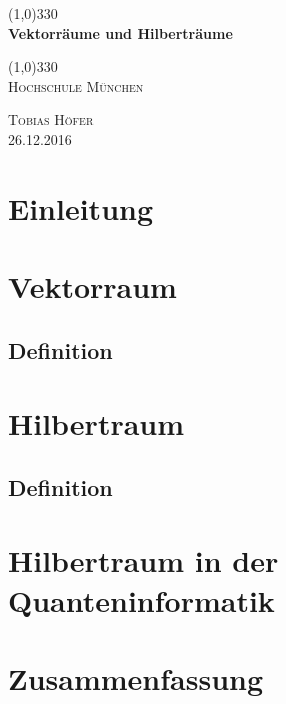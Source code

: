 \documentclass{article}
\begin{document}
\begin{titlepage}
	\begin{center}
	\line(1,0){330} \\
	\vspace{.75 cm}
	\huge{\bfseries Vektorräume und Hilberträume}\\
	\vspace{.25 cm}
	
	\line(1,0){330} \\
	\vspace{1.5 cm}
	\textsc{\LARGE Hochschule M\"unchen}\\
	\vspace{10 cm}
	\end{center}
	\begin{flushright}
	\textsc{\large Tobias H\"ofer\\26.12.2016}
	\end{flushright}
\end{titlepage}
\tableofcontents
\thispagestyle{empty}
\cleardoublepage

\setcounter{page}{1}
\section{Einleitung}\label{sec:intro}
\lipsum[1]
\section{Vektorraum}\label{sec:vec}
\subsection{Definition}\label{sec:vecdef}
\section{Hilbertraum}\label{sec:hil}
\subsection{Definition}\label{sec:hildef}
\section{Hilbertraum in der Quanteninformatik}\label{sec:def}
\section{Zusammenfassung}\label{sec:intro}
\end{document}
